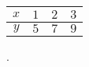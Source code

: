 \begin{tabular}{c|c c c}
\(\displaystyle x\)  & \(\displaystyle 1\)  & \(\displaystyle 2\)  & \(\displaystyle 3\) \\
\hline
\(\displaystyle y\)  & \(\displaystyle 5\)  & \(\displaystyle 7\)  & \(\displaystyle 9\)
\end{tabular}. %